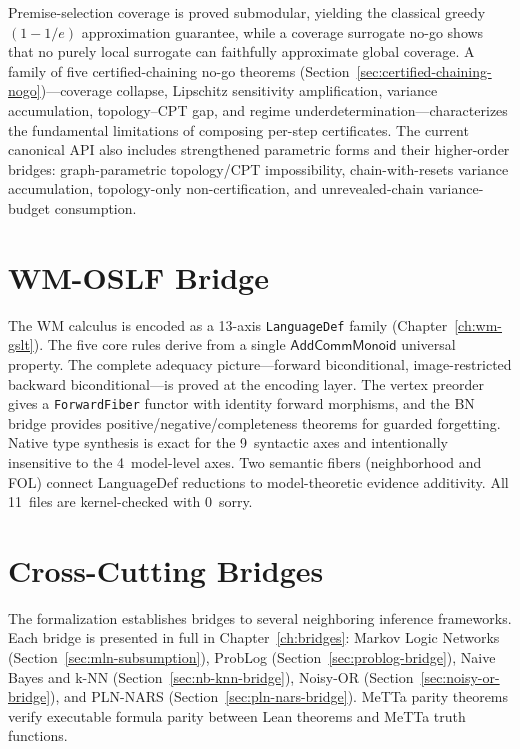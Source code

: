 \documentclass[11pt,openany]{report}
\begin{document}
Premise-selection coverage is proved submodular, yielding the classical
greedy $(1 - 1/e)$ approximation guarantee, while a coverage surrogate
no-go shows that no purely local surrogate can faithfully approximate
global coverage.  A family of five certified-chaining no-go theorems
(Section~\ref{sec:certified-chaining-nogo})---coverage collapse,
Lipschitz sensitivity amplification, variance accumulation,
topology--CPT gap, and regime underdetermination---characterizes the
fundamental limitations of composing per-step certificates.  The current
canonical API also includes strengthened parametric forms and their
higher-order bridges: graph-parametric topology/CPT impossibility,
chain-with-resets variance accumulation, topology-only
non-certification, and unrevealed-chain variance-budget consumption.

\section{WM-OSLF Bridge}

The WM calculus is encoded as a 13-axis \texttt{LanguageDef} family
(Chapter~\ref{ch:wm-gslt}).  The five core rules derive from a single
$\mathsf{AddCommMonoid}$ universal property.  The complete adequacy
picture---forward biconditional, image-restricted backward
biconditional---is proved at the encoding layer.  The vertex preorder
gives a \texttt{ForwardFiber} functor with identity forward morphisms,
and the BN bridge provides positive/negative/completeness theorems for
guarded forgetting.  Native type synthesis is exact for the 9~syntactic
axes and intentionally insensitive to the 4~model-level axes.  Two
semantic fibers (neighborhood and FOL) connect LanguageDef reductions to
model-theoretic evidence additivity.  All 11~files are kernel-checked
with 0~sorry.

\section{Cross-Cutting Bridges}

The formalization establishes bridges to several neighboring
inference frameworks.  Each bridge is presented in full in
Chapter~\ref{ch:bridges}: Markov Logic Networks
(Section~\ref{sec:mln-subsumption}), ProbLog
(Section~\ref{sec:problog-bridge}), Naive Bayes and k-NN
(Section~\ref{sec:nb-knn-bridge}), Noisy-OR
(Section~\ref{sec:noisy-or-bridge}), and PLN-NARS
(Section~\ref{sec:pln-nars-bridge}).  MeTTa parity theorems verify
executable formula parity between Lean theorems and MeTTa truth
functions.
\end{document}
